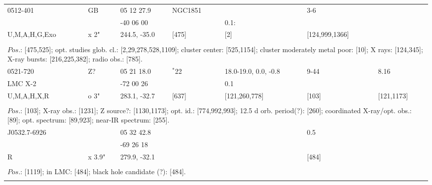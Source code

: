 \documentclass{aa}
\begin{document}
\begin{tabular}{p{2.5cm}p{1cm}p{1.8cm}p{2.3cm}p{3.3cm}p{2.0cm}p{2.2cm}}
\noalign{\smallskip}
0512-401            & GB           & 05 12 27.9         & NGC1851     &                      & 3-6                        &            \\
                             &                  & -40 06 00           &                         & 0.1:              &                               &            \\
U,M,A,H,G,Exo & x 2"          & 244.5, -35.0       & [475]              & [2]                & [124,999,1366]    &            \\
\\
\multicolumn{7}{p{17.5cm}}{
$Pos$.: [475,525]; opt. studies glob. cl.: [2,29,278,528,1109]; cluster center: [525,1154]; cluster moderately metal poor: [10]; 
X rays: [124,345]; X-ray bursts: [216,225,382]; radio obs.: [785].}\\
\noalign{\smallskip}
\hline

\noalign{\smallskip}
0521-720         & Z?      & 05 21 18.0       & $^*$22        & 18.0-19.0, 0.0, -0.8    & 9-44               & 8.16                 \\
LMC X-2          &            &  -72 00 26        &                     &  0.1                               &                        &                         \\
U,M,A,H,X,R   & o 3"   & 283.1, -32.7     &   [637]         & [121,260,778]            & [103]               & [121,1173]    \\
\\
\multicolumn{7}{p{17.5cm}}{
$Pos$.: [103]; X-ray obs.: [1231]; Z source?: [1130,1173]; opt. id.: [774,992,993]; 12.5 d orb. period(?): [260];
coordinated X-ray/opt. obs.: [89]; opt. spectrum: [89,923]; near-IR spectrum: [255].}\\
\noalign{\smallskip}
\hline

\noalign{\smallskip}
J0532.7-6926  &                  & 05 32 42.8       &                             &                  &   0.5                   &  \\
                           &                  & -69 26 18        &                              &                  &                           &  \\
R                        &   x 3.9"    & 279.9, -32.1     &                              &                  &  [484]                &  \\
\\
\multicolumn{7}{p{17.5cm}}{
$Pos$.: [1119]; in LMC: [484]; black hole candidate (?): [484].}\\
\noalign{\smallskip}
\hline


\end{tabular}
\end{document}
